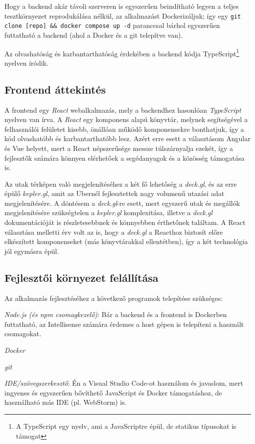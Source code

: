 Hogy a backend akár távoli szerveren is egyszerűen beindítható legyen a teljes tesztkörnyezet reprodukálása nélkül, az alkalmazást Dockerizáljuk; így egy \texttt{git clone [repo] \&\& docker compose up -d} paranccsal bárhol egyszerűen futtatható a backend (ahol a Docker és a git telepítve van).

Az olvashatóság és karbantarthatóság érdekében a backend kódja TypeScript\footnote{A TypeScript egy nyelv, ami a JavaScriptre épül, de statikus típusokat is támogat\cite{typescript}} nyelven íródik.

\subsection{Frontend áttekintés}

A frontend egy \textit{React} webalkalmazás, mely a backendhez hasonlóan \textit{TypeScript} nyelven van írva. A \textit{React} egy komponens alapú könyvtár, melynek segítségével a felhasználói felületet kisebb, önállóan működő komponensekre bonthatjuk, így a kód olvashatóbb és karbantarthatóbb lesz. Azért erre esett a választásom Angular és Vue helyett, mert a React népszerűsége messze túlszárnyalja ezekét\cite{reactcomparison}, így a fejlesztők számára könnyen elérhetőek a segédanyagok és a közösség támogatása is.

Az utak térképen való megjelenítéséhez a két fő lehetőség a \textit{deck.gl}, és az erre épülő\cite{kepler} \textit{kepler.gl}, amit az Ubernél fejlesztettek nagy volumenű utazási adat megjelenítésére. A döntésem a \textit{deck.gl}-re esett, mert egyszerű utak és megállók megjelenítésére szükségtelen a \textit{kepler.gl} komplexitása, illetve a \textit{deck.gl} dokumentációját is részletesebbnek és könnyebben érthetőnek találtam. A React választása melletti érv volt az is, hogy a \textit{deck.gl} a Reacthoz biztosít előre elkészített komponenseket (más könyvtárakkal ellentétben), így a két technológia jól egymásra épül.

\subsection{Fejlesztői környezet felállítása}

Az alkalmazás fejlesztéséhez a következő programok telepítése szükséges:

\begin{compactitem}
    \item \textit{Node.js (és npm csomagkezelő)}: Bár a backend és a frontend is Dockerben futtatható, az Intellisense számára érdemes a host gépen is telepíteni a használt csomagokat.
    \item \textit{Docker}
    \item \textit{git}
    \item \textit{IDE/szövegszerkesztő}: Én a Visual Studio Code-ot használom és javaslom, mert ingyenes és egyszerűen bővíthető JavaScript és Docker támogatáshoz, de használható más IDE (pl. WebStorm) is.
\end{compactitem}


